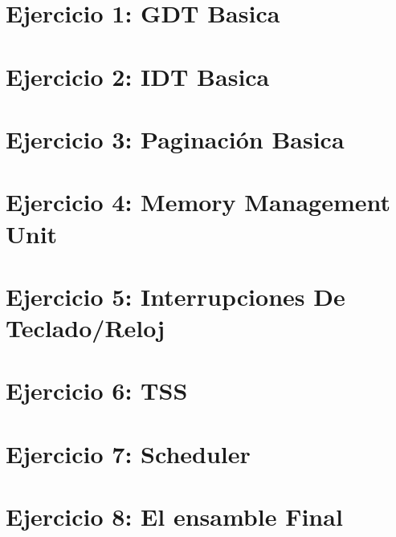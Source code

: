 \documentclass[a4paper]{article}
\begin{document}
\section{Ejercicio 1: GDT Basica}

%

\section{Ejercicio 2: IDT Basica} 
%



\section{Ejercicio 3: Paginación Basica}
%


\section{Ejercicio 4: Memory Management Unit}
%


\section{Ejercicio 5: Interrupciones De Teclado/Reloj}
%



\section{Ejercicio 6: TSS}



\section{Ejercicio 7: Scheduler}


\section{Ejercicio 8: El ensamble Final}
\end{document}
